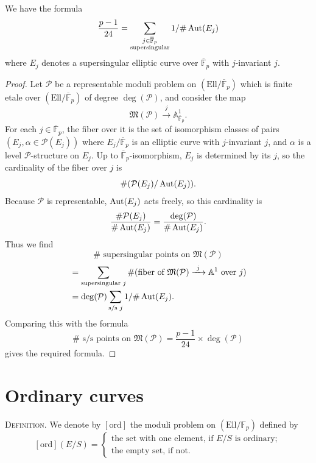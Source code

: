 \begin{kcor}\label{cor:12.4.6}
We have the formula
\[
\frac{p-1}{24} = \sum_{\substack{j \in \overline{\mathbb{F}}_p \\ \text{supersingular}}} 1/\#\operatorname{Aut}(E_j)
\]
where $E_j$ denotes a supersingular elliptic curve over $\overline{\mathbb{F}}_p$ with $j$-invariant $j$.
\end{kcor}

\begin{proof}
Let $\mathcal{P}$ be a representable moduli problem on $(\mathrm{Ell}/\overline{\mathbb{F}}_p)$ which is finite etale over $(\mathrm{Ell}/\overline{\mathbb{F}}_p)$ of degree $\deg(\mathcal{P})$, and consider the map
\[
\mathfrak{M}(\mathcal{P}) \xrightarrow{\ j\ } \mathbb{A}^1_{\overline{\mathbb{F}}_p} .
\]
For each $j \in \overline{\mathbb{F}}_p$, the fiber over it is the set of isomorphism classes of pairs $(E_j, \alpha \in \mathcal{P}(E_j))$ where $E_j/\overline{\mathbb{F}}_p$ is an elliptic curve with $j$-invariant $j$, and $\alpha$ is a level $\mathcal{P}$-structure on $E_j$. Up to $\overline{\mathbb{F}}_p$-isomorphism, $E_j$ is determined by its $j$, so the cardinality of the fiber over $j$ is
\[
\#(\mathcal{P}(E_j)/\operatorname{Aut}(E_j)) .
\]
Because $\mathcal{P}$ is representable, $\operatorname{Aut}(E_j)$ acts freely, so this cardinality is
\[
\frac{\#\mathcal{P}(E_j)}{\#\operatorname{Aut}(E_j)} = \frac{\deg(\mathcal{P})}{\#\operatorname{Aut}(E_j)} .
\]
Thus we find
\[
\# \text{ supersingular points on } \mathfrak{M}(\mathcal{P})
\]
\[
\begin{aligned}
&= \sum_{\text{supersingular } j} \#(\text{fiber of } \mathfrak{M}(\mathcal{P}) \xrightarrow{\ j\ } \mathbb{A}^1 \text{ over } j) \\
&= \deg(\mathcal{P}) \sum_{\text{s/s } j} 1/\#\operatorname{Aut}(E_j) .
\end{aligned}
\]
Comparing this with the formula
\[
\# \text{ s/s points on } \mathfrak{M}(\mathcal{P}) = \frac{p-1}{24} \times \deg(\mathcal{P})
\]
gives the required formula.
\end{proof}

\section{Ordinary curves}
\label{sec:12.5}

\kmitem\label{item:12.5.1}
\textsc{Definition.} We denote by $[\mathrm{ord}]$ the moduli problem on $(\mathrm{Ell}/\mathbb{F}_p)$ defined by
\[
[\mathrm{ord}](E/S) = \begin{cases}
\text{the set with one element, if } E/S \text{ is ordinary}; \\
\text{the empty set, if not.}
\end{cases}
\]

